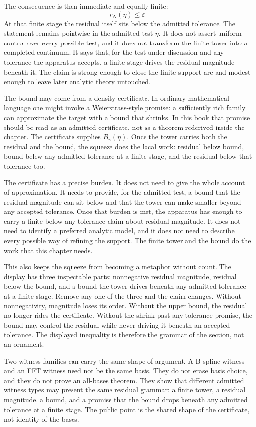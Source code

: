 The consequence is then immediate and equally finite:
\[
  r_N(\eta) \le \varepsilon .
\]
At that finite stage the residual itself sits below the admitted tolerance. The statement remains pointwise in the admitted test \(\eta\). It does not assert uniform control over every possible test, and it does not transform the finite tower into a completed continuum. It says that, for the test under discussion and any tolerance the apparatus accepts, a finite stage drives the residual magnitude beneath it. The claim is strong enough to close the finite-support arc and modest enough to leave later analytic theory untouched.

The bound may come from a density certificate. In ordinary mathematical
language one might invoke a Weierstrass-style promise: a sufficiently rich
family can approximate the target with a bound that shrinks. In this book that
promise should be read as an admitted certificate, not as a theorem rederived
inside the chapter. The certificate supplies \(B_n(\eta)\). Once the tower
carries both the residual and the bound, the squeeze does the local work:
residual below bound, bound below any admitted tolerance at a finite stage, and the residual below that tolerance too.

The certificate has a precise burden. It does not need to give the whole account
of approximation. It needs to provide, for the admitted test, a bound that the
residual magnitude can sit below and that the tower can make smaller beyond
any accepted tolerance. Once that burden is met, the apparatus has enough to
carry a finite below-any-tolerance claim about residual magnitude. It does not need to
identify a preferred analytic model, and it does not need to describe every
possible way of refining the support. The finite tower and the bound do the
work that this chapter needs.

This also keeps the squeeze from becoming a metaphor without count. The display has three inspectable parts: nonnegative residual magnitude, residual below the bound, and a bound the tower drives beneath any admitted tolerance at a finite stage. Remove any one of the three and the claim changes. Without nonnegativity, magnitude loses its order. Without the upper bound, the residual no longer rides the certificate. Without the shrink-past-any-tolerance promise, the bound may control the residual while never driving it beneath an accepted tolerance. The displayed inequality is therefore the grammar of the section, not an ornament.

Two witness families can carry the same shape of argument. A B-spline witness
and an FFT witness need not be the same basis. They do not erase basis choice,
and they do not prove an all-bases theorem. They show that different admitted
witness types may present the same residual grammar: a finite tower, a
residual magnitude, a bound, and a promise that the bound drops beneath any admitted tolerance at a finite stage. The public
point is the shared shape of the certificate, not identity of the bases.

